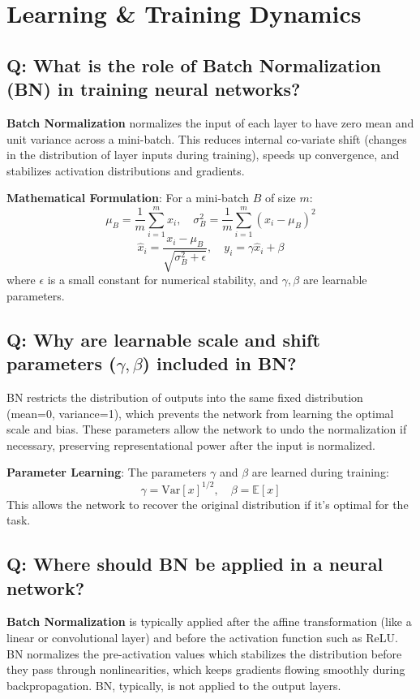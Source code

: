 \section{Learning \& Training Dynamics}

\subsection*{\textcolor{primaryteal}{Q: What is the role of Batch Normalization (BN) in training neural networks?}}
\textbf{Batch Normalization} normalizes the input of each layer to have zero mean and unit variance across a mini-batch. This reduces internal co-variate shift (changes in the distribution of layer inputs during training), speeds up convergence, and stabilizes activation distributions and gradients.

\textbf{Mathematical Formulation}: For a mini-batch $B$ of size $m$:
\[
	\mu_B = \frac{1}{m} \sum_{i=1}^{m} x_i, \quad \sigma_B^2 = \frac{1}{m} \sum_{i=1}^{m} (x_i - \mu_B)^2
\]
\[
	\hat{x}_i = \frac{x_i - \mu_B}{\sqrt{\sigma_B^2 + \epsilon}}, \quad y_i = \gamma \hat{x}_i + \beta
\]
where $\epsilon$ is a small constant for numerical stability, and $\gamma, \beta$ are learnable parameters.

\subsection*{\textcolor{primaryteal}{Q: Why are learnable scale and shift parameters ($\gamma, \beta$) included in BN?}}
BN restricts the distribution of outputs into the same fixed distribution (mean=0, variance=1), which prevents the network from learning the optimal scale and bias. These parameters allow the network to undo the normalization if necessary, preserving representational power after the input is normalized.

\textbf{Parameter Learning}: The parameters $\gamma$ and $\beta$ are learned during training:
\[
	\gamma = \text{Var}[x]^{1/2}, \quad \beta = \mathbb{E}[x]
\]
This allows the network to recover the original distribution if it's optimal for the task.

\subsection*{\textcolor{primaryteal}{Q: Where should BN be applied in a neural network?}}
\textbf{Batch Normalization} is typically applied after the affine transformation (like a linear or convolutional layer) and before the activation function such as ReLU. BN normalizes the pre-activation values which stabilizes the distribution before they pass through nonlinearities, which keeps gradients flowing smoothly during backpropagation. BN, typically, is not applied to the output layers.

